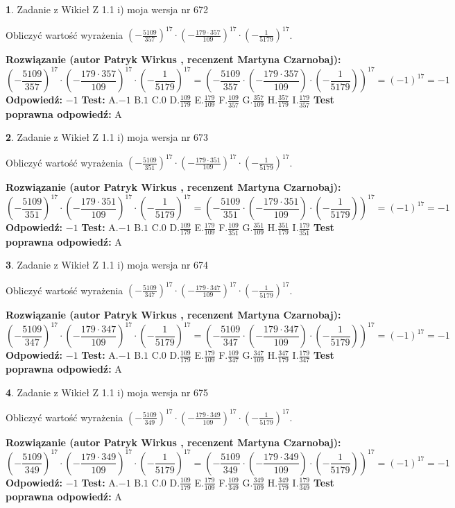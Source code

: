 \documentclass[12pt, a4paper]{article}
\theoremstyle{definition} %
\newtheorem{zad}{}
\newcommand{\zadStart}[1]{\begin{zad}#1\newline}
\newcommand{\zadStop}{\end{zad}}
\newcommand{\rozwStart}[2]{\noindent \textbf{Rozwiązanie (autor #1 , recenzent #2): }\newline}
\newcommand{\rozwStop}{\newline}
\newcommand{\odpStart}{\noindent \textbf{Odpowiedź:}\newline}
\newcommand{\odpStop}{\newline}
\newcommand{\testStart}{\noindent \textbf{Test:}\newline}
\newcommand{\testStop}{\newline}
\newcommand{\kluczStart}{\noindent \textbf{Test poprawna odpowiedź:}\newline}
\newcommand{\kluczStop}{\newline}
\begin{document}
\zadStart{Zadanie z Wikieł Z 1.1 i) moja wersja nr 672}

Obliczyć wartość wyrażenia $(-\frac{5109}{357})^{17} \cdot (-\frac{179 \cdot 357}{109})^{17} \cdot (-\frac{1}{5179})^{17}$.
\zadStop
\rozwStart{Patryk Wirkus}{Martyna Czarnobaj}
$$(-\frac{5109}{357})^{17} \cdot (-\frac{179 \cdot 357}{109})^{17} \cdot (-\frac{1}{5179})^{17} = (-\frac{5109}{357} \cdot (-\frac{179 \cdot 357}{109}) \cdot (-\frac{1}{5179}))^{17} = (-1)^{17} = -1$$
\rozwStop
\odpStart
$-1$
\odpStop
\testStart
A.$-1$ B.$1$ C.$0$ D.$\frac{109}{179}$ E.$\frac{179}{109}$
F.$\frac{109}{357}$ G.$\frac{357}{109}$
H.$\frac{357}{179}$
I.$\frac{179}{357}$
\testStop
\kluczStart
A
\kluczStop



\zadStart{Zadanie z Wikieł Z 1.1 i) moja wersja nr 673}

Obliczyć wartość wyrażenia $(-\frac{5109}{351})^{17} \cdot (-\frac{179 \cdot 351}{109})^{17} \cdot (-\frac{1}{5179})^{17}$.
\zadStop
\rozwStart{Patryk Wirkus}{Martyna Czarnobaj}
$$(-\frac{5109}{351})^{17} \cdot (-\frac{179 \cdot 351}{109})^{17} \cdot (-\frac{1}{5179})^{17} = (-\frac{5109}{351} \cdot (-\frac{179 \cdot 351}{109}) \cdot (-\frac{1}{5179}))^{17} = (-1)^{17} = -1$$
\rozwStop
\odpStart
$-1$
\odpStop
\testStart
A.$-1$ B.$1$ C.$0$ D.$\frac{109}{179}$ E.$\frac{179}{109}$
F.$\frac{109}{351}$ G.$\frac{351}{109}$
H.$\frac{351}{179}$
I.$\frac{179}{351}$
\testStop
\kluczStart
A
\kluczStop



\zadStart{Zadanie z Wikieł Z 1.1 i) moja wersja nr 674}

Obliczyć wartość wyrażenia $(-\frac{5109}{347})^{17} \cdot (-\frac{179 \cdot 347}{109})^{17} \cdot (-\frac{1}{5179})^{17}$.
\zadStop
\rozwStart{Patryk Wirkus}{Martyna Czarnobaj}
$$(-\frac{5109}{347})^{17} \cdot (-\frac{179 \cdot 347}{109})^{17} \cdot (-\frac{1}{5179})^{17} = (-\frac{5109}{347} \cdot (-\frac{179 \cdot 347}{109}) \cdot (-\frac{1}{5179}))^{17} = (-1)^{17} = -1$$
\rozwStop
\odpStart
$-1$
\odpStop
\testStart
A.$-1$ B.$1$ C.$0$ D.$\frac{109}{179}$ E.$\frac{179}{109}$
F.$\frac{109}{347}$ G.$\frac{347}{109}$
H.$\frac{347}{179}$
I.$\frac{179}{347}$
\testStop
\kluczStart
A
\kluczStop



\zadStart{Zadanie z Wikieł Z 1.1 i) moja wersja nr 675}

Obliczyć wartość wyrażenia $(-\frac{5109}{349})^{17} \cdot (-\frac{179 \cdot 349}{109})^{17} \cdot (-\frac{1}{5179})^{17}$.
\zadStop
\rozwStart{Patryk Wirkus}{Martyna Czarnobaj}
$$(-\frac{5109}{349})^{17} \cdot (-\frac{179 \cdot 349}{109})^{17} \cdot (-\frac{1}{5179})^{17} = (-\frac{5109}{349} \cdot (-\frac{179 \cdot 349}{109}) \cdot (-\frac{1}{5179}))^{17} = (-1)^{17} = -1$$
\rozwStop
\odpStart
$-1$
\odpStop
\testStart
A.$-1$ B.$1$ C.$0$ D.$\frac{109}{179}$ E.$\frac{179}{109}$
F.$\frac{109}{349}$ G.$\frac{349}{109}$
H.$\frac{349}{179}$
I.$\frac{179}{349}$
\testStop
\kluczStart
A
\kluczStop
\end{document}
